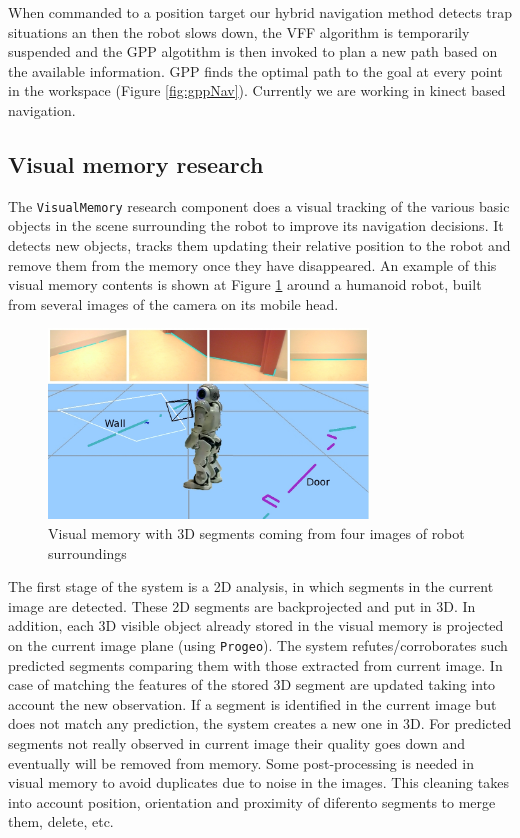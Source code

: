 \documentclass[twocolumn]{svjour3}          %
\begin{document}
When commanded to a position target our hybrid navigation method detects trap situations an then the robot slows down, the VFF algorithm is temporarily suspended and the GPP algotithm is then invoked to plan a new path based on the available information. GPP finds the optimal path to the goal at every point in the workspace (Figure \ref{fig:gppNav}). Currently we are working in kinect based navigation.

\subsection{Visual memory research}

The \texttt{VisualMemory} research component does a visual tracking of the various basic objects in the scene surrounding the robot to improve its navigation decisions. It detects new objects, tracks them updating their relative position to the robot and remove them from the memory once they have disappeared. An example of this visual memory contents is shown at Figure \ref{fig:memory} around a humanoid robot, built from several images of the camera on its mobile head.

\begin{figure}[h!]
\includegraphics[width=8.5cm]{figs/experimentoReal.jpg}
\caption{Visual memory with 3D segments coming from four images of robot surroundings}
\label{fig:memory}
\end{figure}

The first stage of the system is a 2D analysis, in which segments in the current image are detected. These 2D segments are backprojected and put in 3D. In addition, each 3D visible object already stored in the visual memory is projected on the current image plane (using \texttt{Progeo}). The system refutes/corroborates such predicted segments comparing them with those extracted from current image. In case of matching the features of the stored 3D segment are updated taking into account the new observation. If a segment is identified in the current image but does not match any prediction, the system creates a new one in 3D. For predicted segments not really observed in current image their quality goes down and eventually will be removed from memory. Some post-processing is needed in visual memory to avoid duplicates due to noise in the images. This cleaning takes into account position, orientation and proximity of diferento segments to merge them, delete, etc.
\end{document}
